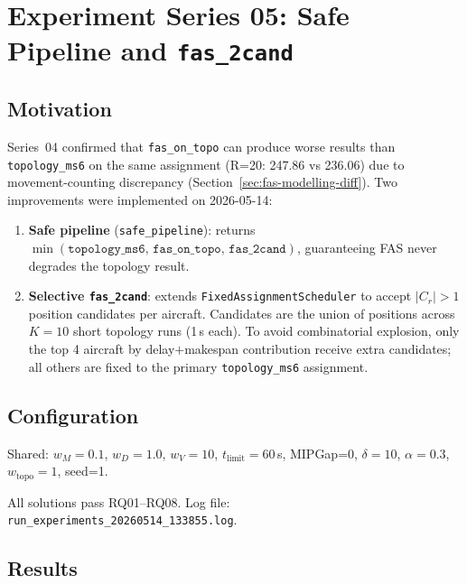 \newpage
\section{Experiment Series 05: Safe Pipeline and \texttt{fas\_2cand}}
\label{sec:exp05}

\subsection{Motivation}

Series~04 confirmed that \texttt{fas\_on\_topo} can produce worse results than
\texttt{topology\_ms6} on the same assignment (R=20: 247.86 vs 236.06) due to
movement-counting discrepancy (Section~\ref{sec:fas-modelling-diff}).  Two
improvements were implemented on 2026-05-14:

\begin{enumerate}[noitemsep]
    \item \textbf{Safe pipeline} (\texttt{safe\_pipeline}): returns
          $\min(\texttt{topology\_ms6},\, \texttt{fas\_on\_topo},\, \texttt{fas\_2cand})$,
          guaranteeing FAS never degrades the topology result.
    \item \textbf{Selective \texttt{fas\_2cand}}: extends \texttt{FixedAssignmentScheduler}
          to accept $|C_r| > 1$ position candidates per aircraft.  Candidates
          are the union of positions across $K=10$ short topology runs (1\,s each).
          To avoid combinatorial explosion, only the top 4 aircraft by
          delay$+$makespan contribution receive extra candidates; all others are
          fixed to the primary \texttt{topology\_ms6} assignment.
\end{enumerate}

\subsection{Configuration}

Shared: $w_M=0.1$, $w_D=1.0$, $w_V=10$, $t_{\text{limit}}=60$\,s,
MIPGap=0, $\delta=10$, $\alpha=0.3$, $w_{\text{topo}}=1$, seed=1.

All solutions pass RQ01--RQ08.  Log file:
\texttt{run\_experiments\_20260514\_133855.log}.

\subsection{Results}
\label{exp:exp05-results}

